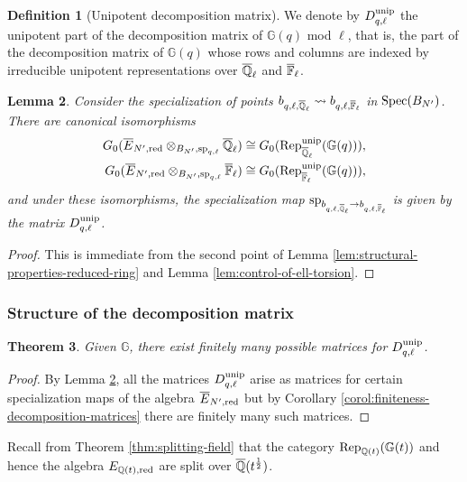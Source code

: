 \documentclass[a4paper, 10pt, oneside, reqno]{amsart}
\theoremstyle{plain}
\newtheorem{thm}{Theorem}[subsection]
\newtheorem{lem}[thm]{Lemma}
\theoremstyle{definition}
\newtheorem{defi}[thm]{Definition}
\theoremstyle{remark}
\newcommand{\Gbb}{\mathbb{G}}
\begin{document}
\begin{defi}[Unipotent decomposition matrix] 
We denote by $D_{q,\ell}^{\mathrm{unip}}$ the unipotent part of the decomposition matrix of $\Gbb(q)$ mod $\ell$, that is, the part of the decomposition matrix of $\Gbb(q)$ whose rows and columns are indexed by irreducible unipotent representations over $\overline{\mathbb{Q}}_{\ell}$ and $\overline{\mathbb{F}}_{\ell}$.
\end{defi}


\begin{lem}\label{lem:comparison-decomposition-matrices}
Consider the specialization of points $b_{q, \ell, \overline{\mathbb{Q}}_{\ell}} \rightsquigarrow b_{q, \ell,\overline{\mathbb{F}}_{\ell}}$ in $\mathrm{Spec}(B_{N'})$. There are canonical isomorphisms 
\begin{align*}
G_0(\overline{E}_{N',\red} \otimes_{B_{N'}, \mathrm{sp}_{q,\ell}} \Qlb) &\cong G_0(\Rep^{\unip}_{\Qlb}(\Gbb(q))), \\
G_0(\overline{E}_{N',\red} \otimes_{B_{N'}, \mathrm{sp}_{q,\ell}} \Flb) &\cong G_0(\Rep^{\unip}_{\Flb}(\Gbb(q))),
\end{align*}
and under these isomorphisms, the specialization map $\mathrm{sp}_{b_{q, \ell, \overline{\mathbb{Q}}_{\ell}} \to b_{q, \ell,\overline{\mathbb{F}}_{\ell}}}$ is given by the matrix $D_{q,\ell}^{\mathrm{unip}}$. 
\end{lem}

\begin{proof}
This is immediate from the second point of Lemma \ref{lem:structural-properties-reduced-ring} and Lemma \ref{lem:control-of-ell-torsion}.
\end{proof}

\subsubsection{Structure of the decomposition matrix}

\begin{thm}\label{thm:finiteness-decomposition-matrices}
Given $\Gbb$, there exist finitely many possible matrices for $D_{q,\ell}^{\mathrm{unip}}$.
\end{thm}

\begin{proof}
By Lemma \ref{lem:comparison-decomposition-matrices}, all the matrices $D_{q,\ell}^{\mathrm{unip}}$ arise as matrices for certain specialization maps of the algebra $\overline{E}_{N',\mathrm{red}}$ but by Corollary \ref{corol:finiteness-decomposition-matrices} there are finitely many such matrices. 
\end{proof}

Recall from Theorem \ref{thm:splitting-field} that the category $\Rep_{\Q(t)}(\Gbb(t))$ and hence the algebra $E_{\mathbb{Q}(t),\mathrm{red}}$ are split over $\overline{\mathbb{Q}}(t^{\frac{1}{2}})$. 
\end{document}
